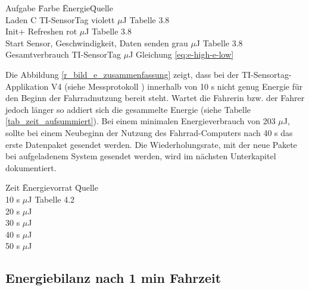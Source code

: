 \begin{minipage}{\textwidth}
\label{everbrauch_aufgaben}
    \begin{tabbing}
    Aufgabe \hspace{6 cm} \quad\=  Farbe \quad\= Energie\quad\= Quelle \\[0.8ex]
    Laden C TI-SensorTag  \> violett       $\mu$J    \> Tabelle 3.8\\
    Init+ Refreshen \> rot  $\mu$J \> Tabelle 3.8\\
    Start Sensor, Geschwindigkeit, Daten senden\> grau  $\mu$J    \> Tabelle 3.8\\
    Gesamtverbrauch TI-SensorTag     \>      $\mu$J    \> Gleichung \ref{eq:e-high-e-low}\\
    \end{tabbing}
\end{minipage}



Die Abbildung \ref{r_bild_e_zusammenfassung} zeigt, dass bei der TI-Sensortag-Applikation V4 (siehe Messprotokoll \cite{messung_energie_sensortag}) innerhalb von 10 s nicht genug Energie für den Beginn der Fahrradnutzung bereit steht. Wartet die Fahrerin bzw. der Fahrer jedoch länger so addiert sich die gesammelte Energie (siehe Tabelle \ref{tab_zeit_aufsummiert}). Bei einem minimalen Energieverbrauch von 203 $\mu$J, sollte bei einem Neubeginn der Nutzung des Fahrrad-Computers nach 40 s das erste Datenpaket gesendet werden. Die Wiederholungsrate, mit der neue Pakete bei aufgeladenem System gesendet werden, wird im nächsten Unterkapitel dokumentiert.

\begin{minipage}{\textwidth}
\label{tab_zeit_aufsummiert}
    \begin{tabbing}
    Zeit  \quad\=  Energievorrat \quad\= Quelle\\[0.8ex]
    10 s   $\mu$J   \>  Tabelle 4.2 \\
    20 s   $\mu$J  \> \\
    30 s   $\mu$J  \> \\
    40 s   $\mu$J  \> \\
    50 s   $\mu$J  \> \\
    \end{tabbing}
\end{minipage}

\subsection{Energiebilanz nach 1 min Fahrzeit}

